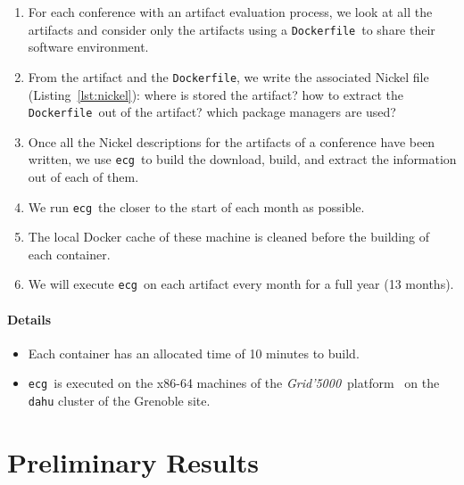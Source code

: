 \documentclass[sigconf,natbib=false]{acmart}
\newcommand{\grid}{\emph{Grid'5000}}
\newcommand{\df}{\texttt{Dockerfile}}
\newcommand{\ecg}{\texttt{ecg}}
\newcommand{\todo}[1]{{\color{red}{TODO: #1}}}
\begin{document}
\begin{enumerate}
\item For each conference with an artifact evaluation process, we look at all the artifacts and consider only the artifacts using a \df\ to share their software environment.
\item From the artifact and the \df, we write the associated Nickel file (Listing~\ref{lst:nickel}): where is stored the artifact? how to extract the \df\ out of the artifact? which package managers are used?
\item Once all the Nickel descriptions for the artifacts of a conference have been written, we use \ecg\ to build the download, build, and extract the information out of each of them.
\item We run \ecg\ the closer to the start of each month as possible.
\item The local Docker cache of these machine is cleaned before the building of each container.
\item We will execute \ecg\ on each artifact every month for a full year (13 months).
\end{enumerate}

\paragraph{Details}

\begin{itemize}
\item Each container has an allocated time of 10 minutes to build.
\item \ecg\ is executed on the x86-64 machines of the \grid\ platform~\cite{grid5000} on the \texttt{dahu} cluster of the Grenoble site.
\end{itemize}



% 

\section{Preliminary Results}\label{sec:results}
\end{document}
